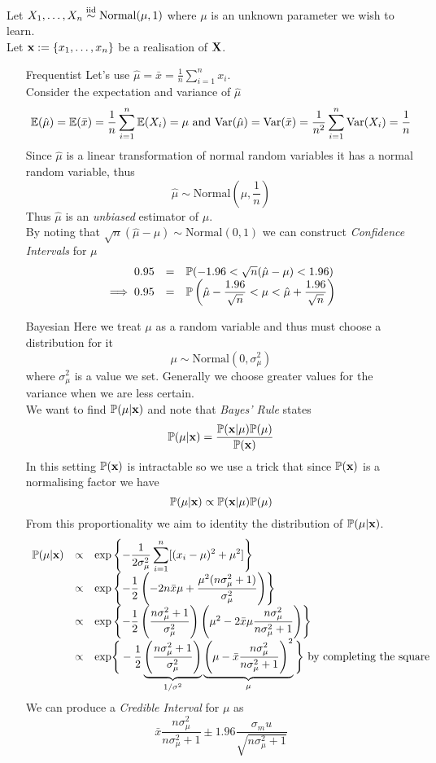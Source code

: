 \documentclass[11pt,a4paper]{article}
\begin{document}
Let $X_1,\dots,X_n\overset{\text{iid}}{\sim}\text{Normal}(\mu,1)$ where $\mu$ is an unknown parameter we wish to learn.\\
Let $\textbf{x}:=\{x_1,\dots,x_n\}$  be a realisation of $\textbf{X}$.
\begin{itemize}
	\item[Frequentist]Let's use $\hat\mu=\bar{x}=\frac{1}{n}\sum_{i=1}^n x_i$.\\
	Consider the expectation and variance of $\hat\mu$
	$$\mathbb{E}(\hat\mu)=\mathbb{E}(\bar{x})=\frac{1}{n}\sum_{i=1}^n\mathbb{E}(X_i)=\mu\text{ and }\mathrm{Var}(\hat\mu)=\mathrm{Var}(\bar{x})=\frac{1}{n^2}\sum_{i=1}^n\mathrm{Var}(X_i)=\frac{1}{n}$$
	Since $\hat\mu$ is a linear transformation of normal random variables it has a normal random variable, thus
	$$\hat\mu\sim\text{Normal}\left(\mu,\frac1n\right)$$
	Thus $\hat\mu$ is an \textit{unbiased} estimator of $\mu$.\\
	By noting that $\sqrt{n}(\hat\mu-\mu)\sim\text{Normal}(0,1)$ we can construct \textit{Confidence Intervals} for $\mu$
	\[\begin{array}{rcl}
	0.95&=&\mathbb{P}(-1.96<\sqrt{n}(\hat\mu-\mu)<1.96)\\
	\implies0.95&=&\mathbb{P}\left(\hat\mu-\dfrac{1.96}{\sqrt{n}}<\mu<\hat\mu+\dfrac{1.96}{\sqrt{n}}\right)
	\end{array}\]
	\item[Bayesian] Here we treat $\mu$ as a random variable and thus must choose a distribution for it
	$$\mu\sim\text{Normal}(0,\sigma^2_\mu)$$
	where $\sigma^2_\mu$ is a value we set. Generally we choose greater values for the variance when we are less certain.\\
	We want to find $\mathbb{P}(\mu|\textbf{x})$ and note that \textit{Bayes' Rule} states
	$$\mathbb{P}(\mu|\textbf{x})=\dfrac{\mathbb{P}(\textbf{x}|\mu)\mathbb{P}(\mu)}{\mathbb{P}(\textbf{x})}$$
	In this setting $\mathbb{P}(\textbf{x})$ is intractable so we use a trick that since $\mathbb{P}(\textbf{x})$ is a normalising factor we have
	$$\mathbb{P}(\mu|\textbf{x})\propto\mathbb{P}(\textbf{x}|\mu)\mathbb{P}(\mu)$$
	From this proportionality we aim to identity the distribution of $\mathbb{P}(\mu|\textbf{x})$.
	\[\begin{array}{rcl}
	\mathbb{P}(\mu|\textbf{x})&\propto&\text{exp}\left\{-\dfrac{1}{2\sigma^2_\mu}\displaystyle\sum_{i=1}^n[(x_i-\mu)^2+\mu^2]\right\}\\
	&\propto&\text{exp}\left\{-\dfrac{1}{2}\left(-2n\bar{x}\mu+\dfrac{\mu^2(n\sigma^2_\mu+1)}{\sigma^2_\mu}\right)\right\}\\
	&\propto&\text{exp}\left\{-\dfrac12\left(\dfrac{n\sigma^2_\mu+1}{\sigma^2_\mu}\right)\left(\mu^2-2\bar{x}\mu\dfrac{n\sigma^2_\mu}{n\sigma^2_\mu+1}\right)\right\}\\
	&\propto&\text{exp}\Bigg\{-\dfrac12\underbrace{\left(\dfrac{n\sigma^2_\mu+1}{\sigma^2_\mu}\right)}_{1/\sigma^2}\underbrace{\left(\mu-\bar{x}\dfrac{n\sigma^2_\mu}{n\sigma^2_\mu+1}\right)^2}_\mu\Bigg\}\text{ by completing the square}
	\end{array}\]
	We can produce a \textit{Credible Interval} for $\mu$ as
	$$\bar{x}\dfrac{n\sigma^2_\mu}{n\sigma^2_\mu+1}\pm1.96\dfrac{\sigma_mu}{\sqrt{n\sigma^2_\mu+1}}$$
\end{itemize}
\end{document}
